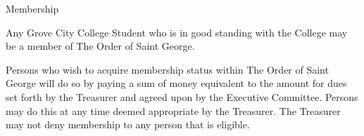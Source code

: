 {
	\begin{article}{Membership}
		\item Any Grove City College Student who is in good standing with the College may be a member of The Order of Saint George.
		\item Persons who wish to acquire membership status within The Order of Saint George will do so by paying a sum of money equivalent to the amount for dues set forth by the Treasurer and agreed upon by the Executive Committee.  Persons may do this at any time deemed appropriate by the Treasurer.  The Treasurer may not deny membership to any person that is eligible.
	\end{article}
}